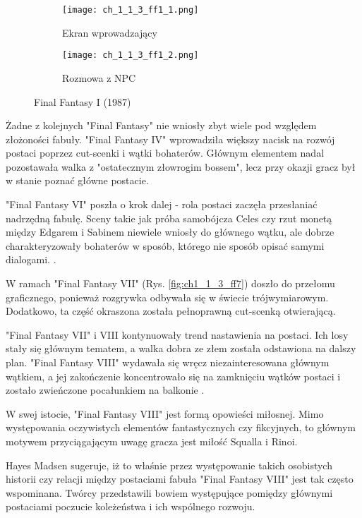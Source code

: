 \begin{figure}[h]
	\begin{subfigure}{0.49\textwidth}
		\caption{Ekran wprowadzający}
		\texttt{[image: ch\_1\_1\_3\_ff1\_1.png]}
		\label{subfig:ch_1_1_3_ff1_1}
	\end{subfigure}
	\begin{subfigure}{0.49\textwidth}
		\caption{Rozmowa z NPC}
		\texttt{[image: ch\_1\_1\_3\_ff1\_2.png]}
		\label{subfig:ch_1_1_3_ff1_2}
	\end{subfigure}
	\caption{Final Fantasy I (1987)}
	\label{fig:ch1_1_3_ff1}
\end{figure}

\newpage

Żadne z kolejnych "Final Fantasy" nie wniosły zbyt wiele pod względem złożoności fabuły. "Final Fantasy
IV" wprowadziła większy nacisk na rozwój postaci poprzez cut-scenki i wątki bohaterów. Głównym elementem
nadal pozostawała walka z "ostatecznym złowrogim bossem", lecz przy okazji gracz był w stanie poznać
główne postacie\cite{the_evolution_of_final_fantasy}.

"Final Fantasy VI" poszła o krok dalej - rola postaci zaczęła przesłaniać nadrzędną fabułę. Sceny takie
jak próba samobójcza Celes czy rzut monetą między Edgarem i Sabinem niewiele wniosły do głównego wątku,
ale dobrze charakteryzowały bohaterów w sposób, którego nie sposób opisać samymi dialogami.
\cite{the_evolution_of_final_fantasy}.

W ramach "Final Fantasy VII" (Rys. \ref{fig:ch1_1_3_ff7}) doszło do przełomu graficznego, ponieważ
rozgrywka odbywała się w świecie trójwymiarowym. Dodatkowo, ta część okraszona została pełnoprawną
cut-scenką otwierającą.

"Final Fantasy VII" i VIII kontynuowały trend nastawienia na postaci.
Ich losy stały się głównym tematem, a walka dobra ze złem została odstawiona na dalszy plan.
"Final Fantasy VIII" wydawała się wręcz niezainteresowana głównym wątkiem, a jej zakończenie
koncentrowało się na zamknięciu wątków postaci i zostało zwieńczone pocałunkiem na balkonie
\cite{the_evolution_of_final_fantasy}.

W swej istocie, "Final Fantasy VIII" jest formą opowieści miłosnej. Mimo występowania oczywistych
elementów fantastycznych czy fikcyjnych, to głównym motywem przyciągającym uwagę gracza jest
miłość Squalla i Rinoi\cite{25_years_later}.

Hayes Madsen sugeruje, iż to właśnie przez występowanie takich osobistych historii czy relacji między
postaciami fabuła "Final Fantasy VIII" jest tak często wspominana. Twórcy przedstawili bowiem występujące
pomiędzy głównymi postaciami poczucie koleżeństwa i ich wspólnego rozwoju\cite{25_years_later}.

